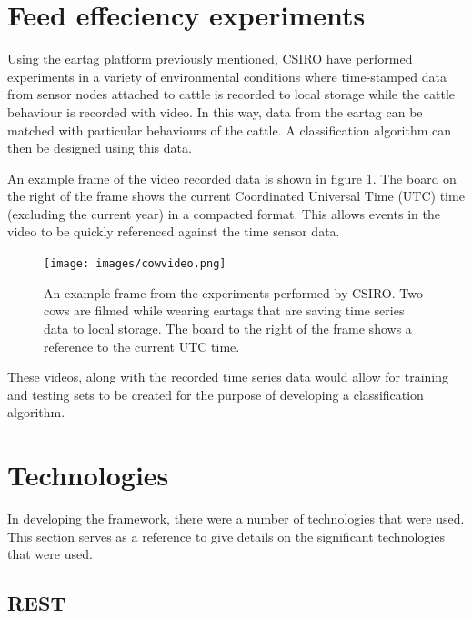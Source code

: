 \section{Feed effeciency experiments}

Using the eartag platform previously mentioned, CSIRO have performed experiments in a variety of environmental conditions where time-stamped data from sensor nodes attached to cattle is recorded to local storage while the cattle behaviour is recorded with video. In this way, data from the eartag can be matched with particular behaviours of the cattle. A classification algorithm can then be designed using this data.

An example frame of the video recorded data is shown in figure \ref{cowvideo}. The board on the right of the frame shows the current Coordinated Universal Time (UTC) time (excluding the current year) in a compacted format. This allows events in the video to be quickly referenced against the time sensor data.

\begin{figure}[ht!]
\begin{center}
\leavevmode
\texttt{[image: images/cowvideo.png]}
\end{center}
\caption[Frame of cattle video]{An example frame from the experiments performed by CSIRO. Two cows are filmed while wearing eartags that are saving time series data to local storage. The board to the right of the frame shows a reference to the current UTC time.}
\label{cowvideo}
\end{figure}

These videos, along with the recorded time series data would allow for training and testing sets to be created for the purpose of developing a classification algorithm.

\section{Technologies}

In developing the framework, there were a number of technologies that were used. This section serves as a reference to give details on the significant technologies that were used. 

\subsection{REST}


